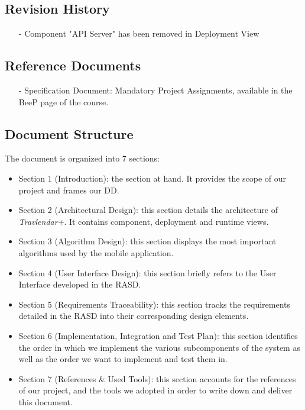 \subsection{Revision History}
		\begin{itemize}
			\item[-] Component "API Server" has been removed in Deployment View
		\end{itemize}

\subsection{Reference Documents}
\begin{itemize}
		\item[-] \textsf{Specification Document: Mandatory Project Assignments}, available in the BeeP page of the course.
\end{itemize} 

\subsection{Document Structure}
The document is organized into 7 sections:

\begin{itemize}
	\item Section 1 (Introduction): the section at hand. It provides the scope of our project and frames our DD.
	\item Section 2 (Architectural Design): this section details the architecture of \textit{Travlendar+}. It contains component, deployment and runtime views.
	\item Section 3 (Algorithm Design): this section displays the most important algorithms used by the mobile application.
	\item Section 4 (User Interface Design): this section briefly refers to the User Interface developed in the RASD.
	\item Section 5 (Requirements Traceability): this section tracks the requirements detailed in the RASD into their corresponding design elements.
	\item Section 6 (Implementation, Integration and Test Plan): this section identifies the order in which we implement the various subcomponents of the system as well as the order we want to implement and test them in.
	\item Section 7 (References \& Used Tools): this section accounts for the references of our project, and the tools we adopted in order to write down and deliver this document.
\end{itemize}

